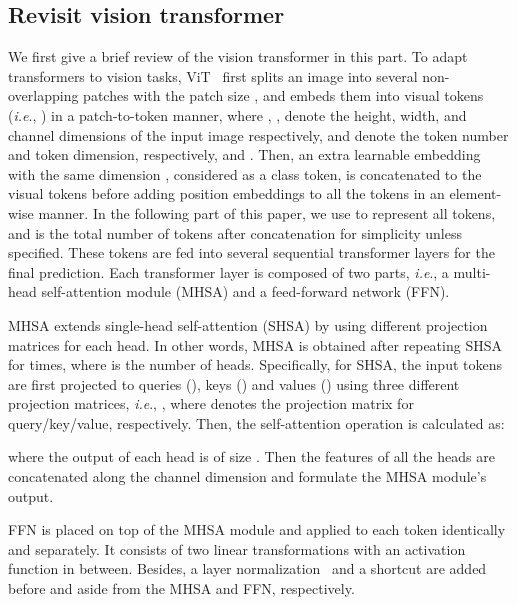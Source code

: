 \documentclass[twocolumn]{svjour3}          \smartqed  \usepackage{natbib}
\newcommand{\ie}{i.e}
\def\onedot{.\xspace}
\def\ie{\emph{i.e}\onedot}
\begin{document}
\subsection{Revisit vision transformer}
We first give a brief review of the vision transformer in this part. To adapt transformers to vision tasks, ViT~\citep{dosovitskiy2020image} first splits an image  into several non-overlapping patches with the patch size , and embeds them into visual tokens (\ie, ) in a patch-to-token manner, where , ,  denote the height, width, and channel dimensions of the input image respectively,  and  denote the token number and token dimension, respectively, and . Then, an extra learnable embedding with the same dimension , considered as a class token, is concatenated to the visual tokens before adding position embeddings to all the tokens in an element-wise manner. In the following part of this paper, we use  to represent all tokens, and  is the total number of tokens after concatenation for simplicity unless specified. These tokens are fed into several sequential transformer layers for the final prediction. Each transformer layer is composed of two parts, \ie, a multi-head self-attention module (MHSA) and a feed-forward network (FFN).

MHSA extends single-head self-attention (SHSA) by using different projection matrices for each head. In other words, MHSA is obtained after repeating SHSA for  times, where  is the number of heads. Specifically, for SHSA, the input tokens  are first projected to queries (), keys () and values () using three different projection matrices, \ie,  , where  denotes the projection matrix for query/key/value, respectively. Then, the self-attention operation is calculated as:

where the output of each head is of size . Then the features of all the  heads are concatenated along the channel dimension and formulate the MHSA module's output.

FFN is placed on top of the MHSA module and applied to each token identically and separately. It consists of two linear transformations with an activation function in between. Besides, a layer normalization~\citep{ba2016layer} and a shortcut are added before and aside from the MHSA and FFN, respectively. 
\end{document}
